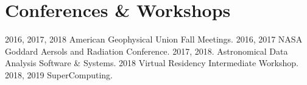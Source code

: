 \documentclass[10pt]{article}
\begin{document}
\section*{Conferences \& Workshops}
2016, 2017, 2018 American Geophysical Union Fall Meetings. 2016, 2017 NASA Goddard Aersols and Radiation Conference. 2017, 2018. Astronomical Data Analysis Software \& Systems. 2018 Virtual Residency Intermediate Workshop. 2018, 2019 SuperComputing.

\end{document}
